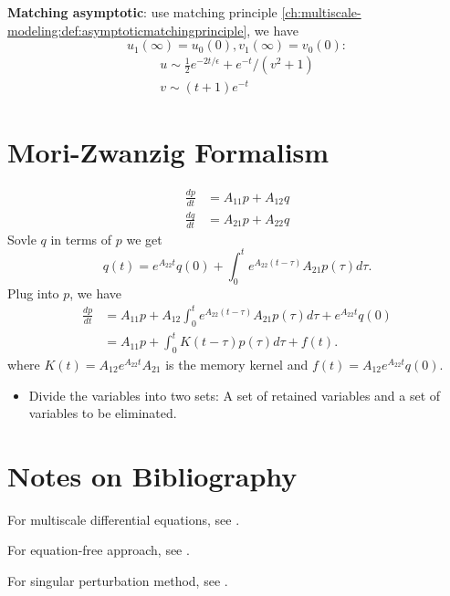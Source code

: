 \begin{refsection}
\begin{example}
\textbf{Matching asymptotic}: use matching principle \autoref{ch:multiscale-modeling:def:asymptoticmatchingprinciple},
we have $$u_1(\infty) = u_0(0), v_1(\infty) = v_0(0):$$
\begin{align*}
u\sim \frac{1}{2}e^{-2t/\epsilon} +  e^{-t}/(v^2 + 1)\\
v\sim (t + 1)e^{-t}
\end{align*}
\end{example}







\section{Mori-Zwanzig Formalism}
\begin{example}\cite[85]{weinan2011principles}
	\begin{align*}
	\frac{dp}{dt} &= A_{11}p + A_{12}q\\
	\frac{dq}{dt} &= A_{21}p + A_{22}q
	\end{align*}
	Sovle $q$ in terms of $p$ we get
	$$q(t) = e^{A_{22}t} q(0) + \int_0^t e^{A_{22}(t-\tau)} A_{21} p(\tau) d\tau.$$
	Plug into $p$, we have
	\begin{align*}
	\frac{dp}{dt} &= A_{11}p + A_{12}\int_0^t e^{A_{22}(t-\tau)} A_{21} p(\tau) d\tau +  e^{A_{22}t} q(0) \\
	&=A_{11} p + \int_0^t K(t-\tau) p(\tau) d\tau + f(t).
	\end{align*}
	where $K(t) = A_{12}e^{A_{22}t} A_{21}$ is the memory kernel and $f(t) = A_{12}e^{A_{22}t}q(0)$.
\end{example}




\begin{remark}\hfill
	\begin{itemize}
		\item Divide the variables into two sets: A set of retained variables and a set of variables to be eliminated.
	\end{itemize}
\end{remark}



\section{Notes on Bibliography}


For multiscale differential equations, see \cite{pavliotis2008multiscale}\cite{verhulst2005methods}.

For equation-free approach, see \cite{kevrekidis2009equation}.

For singular perturbation method, see \cite{johnson2006singular}\cite{holmes2012introduction}\cite{verhulst2005methods}.
\printbibliography


\end{refsection}
